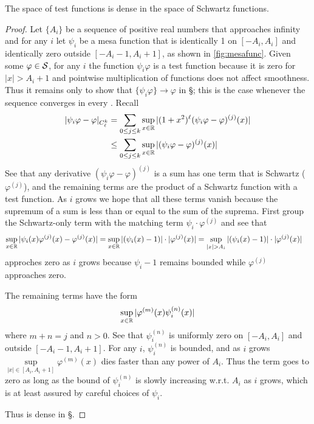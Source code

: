     \begin{lemma}
      \label{lemma:ddenseins}
      The space of test functions is dense in the space of Schwartz functions.
    \end{lemma}
    \begin{proof}
      Let $\{A_i\}$ be a sequence of positive real numbers that approaches infinity and for any $i$ let $\psi_i$ be a mesa function that is identically 1 on $[-A_i,A_i]$ and identically zero outside $[-A_i-1,A_i+1]$, as shown in \cref{fig:mesafunc}.
      Given some $\varphi\in\S$, for any $i$ the function $\psi_i\varphi$ is a test function because it is zero for $|x|>A_i+1$ and pointwise multiplication of functions does not affect smoothness.
      Thus it remains only to show that $\{\psi_i\varphi\}\rightarrow\varphi$ in \S; this is the case whenever the sequence converges in every \Ckl.
      Recall
      \begin{align*}
        |\psi_i\varphi - \varphi|_\Ckl
        &= \sum_{0\le j\le k} \sup_{x\in\R} |(1+x^2)^\ell (\psi_i\varphi-\varphi)^{(j)}(x)|
        \\&\le \sum_{0\le j\le k} \sup_{x\in\R} |(\psi_i\varphi-\varphi)^{(j)}(x)|
      \end{align*}
      See that any derivative $(\psi_i\varphi-\varphi)^{(j)}$ is a sum has one term that is Schwartz ($\varphi^{(j)}$), and the remaining terms are the product of a Schwartz function with a test function.
      As $i$ grows we hope that all these terms vanish because the supremum of a sum is less than or equal to the sum of the suprema.
      First group the Schwartz-only term with the matching term $\psi_i\cdot\varphi^{(j)}$ and see that 
      \begin{align*}
        \sup_{x\in\R} |\psi_i(x)\varphi^{(j)}(x)-\varphi^{(j)}(x)|
        &= \sup_{x\in\R} |(\psi_i(x)-1)|\cdot|\varphi^{(j)}(x)|
        = \sup_{|x|>A_i} |(\psi_i(x)-1)|\cdot|\varphi^{(j)}(x)|
      \end{align*}
      approches zero as $i$ grows because $\psi_i-1$ remains bounded while $\varphi^{(j)}$ approaches zero.
      
      The remaining terms have the form
      \begin{align*}
        \sup_{x\in\R} |\varphi^{(m)}(x)\psi_i^{(n)}(x)|
      \end{align*}
      where $m+n=j$ and $n>0$.
      See that $\psi_i^{(n)}$ is uniformly zero on $[-A_i,A_i]$ and outside $[-A_i-1,A_i+1]$.
      For any $i$, $\psi_i^{(n)}$ is bounded, and as $i$ grows $\sup\limits_{|x|\in[A_i,A_i+1]}\varphi^{(m)}(x)$ dies faster than any power of $A_i$.
      Thus the term goes to zero as long as the bound of $\psi_i^{(n)}$ is slowly increasing w.r.t. $A_i$ as $i$ grows, which is at least assured by careful choices of $\psi_i$.  

      Thus \D is dense in \S.
    \end{proof}

